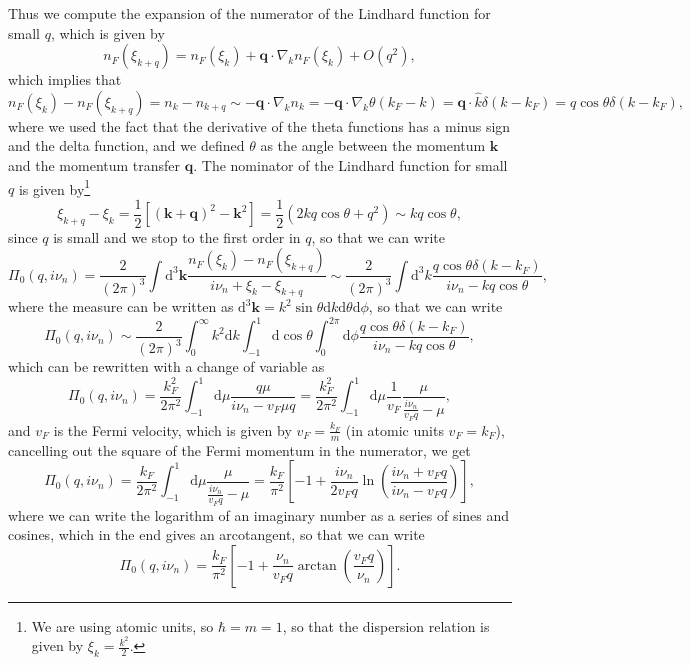 Thus we compute the expansion of the numerator of the Lindhard function for small \(q\), which is given by
\[
    n_F (\xi_{k+q}) = n_F(\xi_k) + \mathbf{q} \cdot \nabla_k n_F(\xi_k) + O(q^2),
\]
which implies that
\[
    n_F(\xi_{k}) - n_F(\xi_{k+q}) = n_k - n_{k+q} \sim - \mathbf{q} \cdot \nabla_k n_k = - \mathbf{q} \cdot \nabla_k \theta(k_F - k) = \mathbf{q} \cdot \hat{k} \delta(k - k_F) = q \cos \theta \delta(k - k_F),
\]
where we used the fact that the derivative of the theta functions has a minus sign and the delta function, and we defined \(\theta\) as the angle between the momentum \(\mathbf{k}\) and the momentum transfer \(\mathbf{q}\). The nominator of the Lindhard function for small \(q\) is given by\footnote{We are using atomic units, so \(\hbar = m = 1\), so that the dispersion relation is given by \(\xi_k = \tfrac{k^2}{2}\).}
\[
    \xi_{k+q} - \xi_k = \frac{1}{2} \left[ (\mathbf{k}+\mathbf{q})^2 - \mathbf{k}^2 \right] = \frac{1}{2} (2 k q \cos \theta + q^2) \sim k q \cos \theta,
\]
since \(q\) is small and we stop to the first order in \(q\), so that we can write
\[
    \Pi_0(q, i \nu_n) = \frac{2}{(2\pi)^3} \int \mathrm{d}^3 \mathbf{k} \frac{n_F(\xi_{k}) - n_F(\xi_{k+q})}{i \nu_n + \xi_k - \xi_{k+q}} \sim \frac{2}{(2\pi)^3} \int \mathrm{d}^3 k \frac{q \cos \theta \delta(k - k_F)}{i \nu_n - k q \cos \theta},
\]
where the measure can be written as \(\mathrm{d}^3 \mathbf{k} = k^2 \sin \theta \mathrm{d}k \mathrm{d}\theta \mathrm{d}\phi\), so that we can write
\[
    \Pi_0(q, i \nu_n) \sim \frac{2}{(2\pi)^3} \int_0^{\infty} k^2 \mathrm{d}k \int_{-1}^{1} \mathrm{d}\cos\theta \int_0^{2\pi} \mathrm{d}\phi \frac{q \cos \theta \delta(k - k_F)}{i \nu_n - k q \cos \theta},
\]
which can be rewritten with a change of variable as
\[
    \Pi_0(q, i \nu_n) = \frac{k_F^2}{2\pi^2} \int_{-1}^{1} \mathrm{d}\mu \frac{q \mu}{i \nu_n - v_F \mu q} = \frac{k_F^2}{2\pi^2} \int_{-1}^{1} \mathrm{d}\mu \frac{1}{v_F}\frac{\mu}{\frac{i \nu_n}{v_F q} - \mu},
\]
and \(v_F\) is the Fermi velocity, which is given by \(v_F = \frac{k_F}{m}\) (in atomic units \(v_F = k_F\)), cancelling out the square of the Fermi momentum in the numerator, we get
\[
    \Pi_0(q, i \nu_n) = \frac{k_F}{2\pi^2} \int_{-1}^{1} \mathrm{d}\mu \frac{\mu}{\frac{i \nu_n}{v_F q} - \mu} = \frac{k_F}{\pi^2} \left[ - 1 + \frac{i \nu_n}{2 v_F q} \ln \left( \frac{i \nu_n + v_F q}{i \nu_n - v_F q} \right) \right],
\]
where we can write the logarithm of an imaginary number as a series of sines and cosines, which in the end gives an arcotangent, so that we can write
\[
    \Pi_0(q, i \nu_n) = \frac{k_F}{\pi^2} \left[ - 1 + \frac{\nu_n}{v_F q} \arctan \left( \frac{v_F q}{\nu_n} \right) \right].
\]

